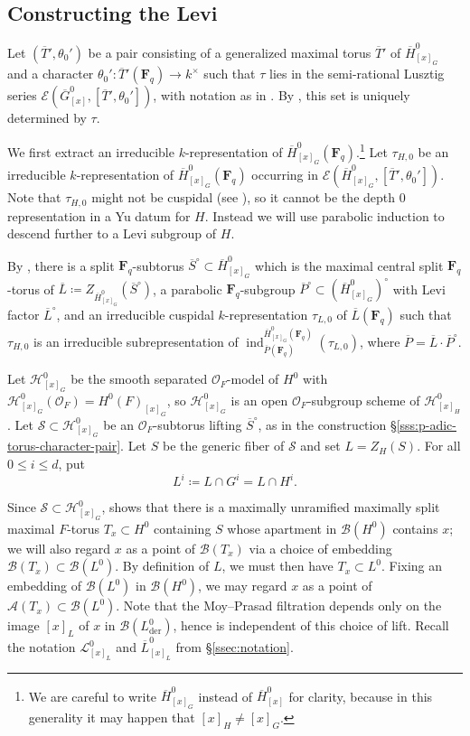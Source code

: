 \documentclass[reqno]{amsart}
\numberwithin{equation}{subsection}
\newcommand{\F}{\mathbf{F}}
\newcommand{\ol}[1]{\overline{#1}}
\newcommand{\co}{\colon}
\newcommand\cA{\mathcal{A}}
\newcommand\cB{\mathcal{B}}
\newcommand\cE{\mathcal{E}}
\newcommand\cH{\mathcal{H}}
\newcommand\cL{\mathcal{L}}
\newcommand\cO{\mathcal{O}}
\newcommand\cS{\mathcal{S}}
\DeclareMathOperator{\ind}{ind}
\DeclareMathOperator{\der}{der}
\theoremstyle{remark}
\numberwithin{equation}{subsection}
\numberwithin{figure}{subsection}
\begin{document}
\subsection{Constructing the Levi}\label{sss:descended-levi-construction}

Let $(\ol T', \theta_0')$ be a pair consisting of a generalized maximal torus $\ol T'$ of $\ol H^0_{[x]_G}$ and a character $\theta_0'\co \ol T'(\F_q) \to k^\times$ such that $\tau$ lies in the semi-rational Lusztig series $\cE(\ol G^0_{[x]}, [\ol T', \theta_0'])$, with notation as in \cite[Definition~2.8.2]{Cot26b}. By \cite[Lemma~2.8.4]{Cot26b}, this set is uniquely determined by $\tau$.

We first extract an irreducible $k$-representation of $\ol H^0_{[x]_G}(\F_q)$.\footnote{We are careful to write $\ol H^0_{[x]_G}$ instead of $\ol H^0_{[x]}$ for clarity, because in this generality it may happen that $[x]_H \neq [x]_G$.} Let $\tau_{H,0}$ be an irreducible $k$-representation of $\ol H^0_{[x]_G}(\F_q)$ occurring in $\cE(\ol H^0_{[x]_G}, [\ol T', \theta_0'])$. Note that $\tau_{H,0}$ might not be cuspidal (see \cite[Remark~3.4.4]{Cot26b}), so it cannot be the depth $0$ representation in a Yu datum for $H$. Instead we will use parabolic induction to descend further to a Levi subgroup of $H$.

By \cite[Lemma~2.10.2]{Cot26b}, there is a split $\F_q$-subtorus $\ol S^\circ \subset \ol H^0_{[x]_G}$ which is the maximal central split $\F_q$-torus of $\ol L \coloneqq Z_{\ol H^0_{[x]_G}}(\ol S^\circ)$, a parabolic $\F_q$-subgroup $\ol P^\circ \subset (\ol H^0_{[x]_G})^\circ$ with Levi factor $\ol L^\circ$, and an irreducible cuspidal $k$-representation $\tau_{L,0}$ of $\ol L(\F_q)$ such that $\tau_{H,0}$ is an irreducible subrepresentation of $\ind_{\ol P(\F_q)}^{\ol H^0_{[x]_G}(\F_q)}(\tau_{L,0})$, where $\ol P = \ol L \cdot \ol P^\circ$.

Let $\cH^0_{[x]_G}$ be the smooth separated $\cO_F$-model of $H^0$ with $\cH^0_{[x]_G}(\cO_F) = H^0(F)_{[x]_G}$, so $\cH^0_{[x]_G}$ is an open $\cO_F$-subgroup scheme of $\cH^0_{[x]_H}$. Let $\cS \subset \cH^0_{[x]_G}$ be an $\cO_F$-subtorus lifting $\ol S^\circ$, as in the construction \S\ref{sss:p-adic-torus-character-pair}. Let $S$ be the generic fiber of $\cS$ and set $L=Z_H(S)$. For all $0\leq i\leq d$, put
\[
L^i \coloneqq L \cap G^i = L \cap H^i.
\]

Since $\cS\subset\cH^0_{[x]_G}$, \cite[\S9.7.6(2)]{KP} shows that there is a maximally unramified maximally split maximal $F$-torus $T_x\subset H^0$ containing $S$ whose apartment in $\cB(H^0)$ contains $x$; we will also regard $x$ as a point of $\cB(T_x)$ via a choice of embedding $\cB(T_x) \subset \cB(L^0)$. By definition of $L$, we must then have $T_x\subset L^0$. Fixing an embedding of $\cB(L^0)$ in $\cB(H^0)$, we may regard $x$ as a point of $\cA(T_x) \subset \cB(L^0)$. Note that the Moy--Prasad filtration depends only on the image $[x]_L$ of $x$ in $\cB(L^0_{\der})$, hence is independent of this choice of lift. Recall the notation $\cL^0_{[x]_L}$ and $\ol L^0_{[x]_L}$ from \S\ref{ssec:notation}. 
\end{document}
